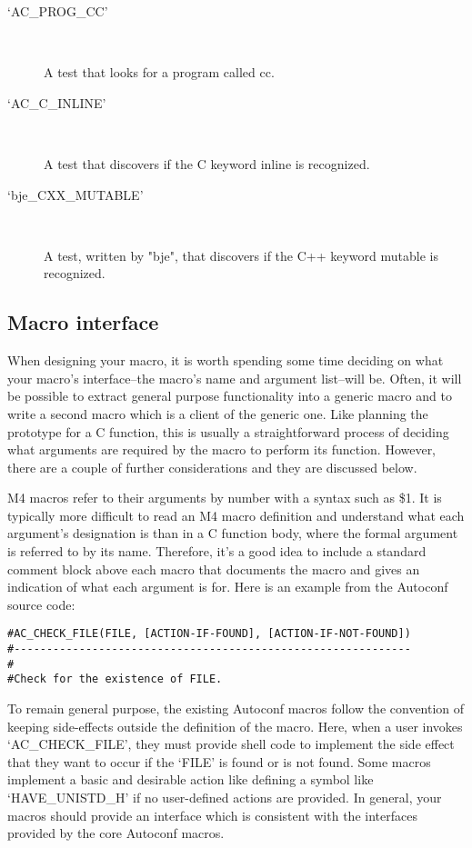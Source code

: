 \begin{description}
\item[`AC\_{}PROG\_{}CC']
\

    A test that looks for a program called cc.

\item[`AC\_{}C\_{}INLINE']
\

    A test that discovers if the C keyword inline is recognized.

\item[`bje\_{}CXX\_{}MUTABLE']
\

    A test, written by "bje", that discovers if the C++ keyword mutable is recognized. 
\end{description}

\subsection{Macro interface}

When designing your macro, it is worth spending some time deciding on what your macro's interface--the macro's name and argument list--will be. Often, it will be possible to extract general purpose functionality into a generic macro and to write a second macro which is a client of the generic one. Like planning the prototype for a C function, this is usually a straightforward process of deciding what arguments are required by the macro to perform its function. However, there are a couple of further considerations and they are discussed below.

M4 macros refer to their arguments by number with a syntax such as \$1. It is 
typically more difficult to read an M4 macro definition and understand what each argument's designation is than in a C function body, where the formal argument is referred to by its name. Therefore, it's a good idea to include a standard comment block above each macro that documents the macro and gives an indication of what each argument is for. Here is an example from the Autoconf source code: 

\begin{Verbatim}[frame=single]
#AC_CHECK_FILE(FILE, [ACTION-IF-FOUND], [ACTION-IF-NOT-FOUND])
#-------------------------------------------------------------
#
#Check for the existence of FILE.
\end{Verbatim}

To remain general purpose, the existing Autoconf macros follow the convention of keeping side-effects outside the definition of the macro. Here, when a user invokes `AC\_{}CHECK\_{}FILE', they must provide shell code to implement the side effect that they want to occur if the `FILE' is found or is not found. Some macros implement a basic and desirable action like defining a symbol like `HAVE\_{}UNISTD\_{}H' if no user-defined actions are provided. In general, your macros should provide an interface which is consistent with the interfaces provided by the core Autoconf macros.

